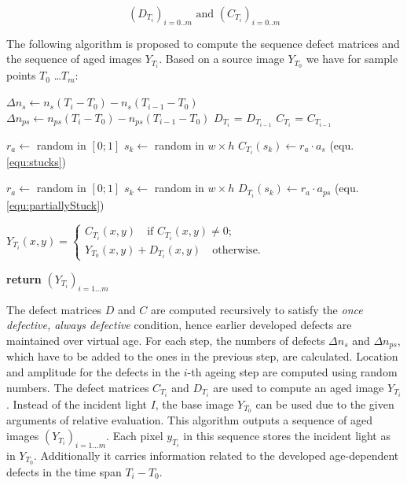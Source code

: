 \documentclass[10pt,twocolumn,letterpaper]{article}
\begin{document}
\begin{equation}
(D_{T_i})_{i=0..m} \text{ and } (C_{T_i})_{i=0..m}
\end{equation}

The following algorithm is proposed to compute the sequence defect matrices and the sequence of aged images $Y_{T_i}$. Based on a source image $Y_{T_0}$ we have for sample points $T_0$ \dots $T_m$:

\vspace{2mm}
\begin{algorithmic}[1]


\State $\Delta n_s\gets n_s(T_i - T_0) - n_s(T_{i-1} - T_0) $ 
\State $\Delta n_{ps}\gets n_{ps}(T_i - T_0) - n_{ps}(T_{i-1} - T_0) $
\State $D_{T_i}$ = $D_{T_{i-1}}$
\State $C_{T_i}$ = $C_{T_{i-1}}$

    \State $r_a \gets$ random in $[0;1]$
    \State $s_k \gets$ random in $w \times h$
    \State $C_{T_{i}}(s_k) \gets r_a \cdot a_s$ (equ. \ref{equ:stucks})
  \EndFor
  
    \State $r_a \gets$ random in $[0;1]$ 
    \State $s_k \gets$ random in $w \times h$
    \State $D_{T_i}({s_k}) \gets r_a \cdot a_{ps}$ (equ. \ref{equ:partiallyStuck})
  \EndFor
  
  
  $Y_{T_{i}}(x,y) = \begin{cases}
  C_{T_i}(x,y) \quad \text{if $C_{T_i}(x,y) \neq 0$}; \\
  Y_{T_{0}}(x,y) +D_{T_i}(x,y)  \quad \text{otherwise}.
  \end{cases}$
  
\EndFor
\State \textbf{return} $(Y_{T_i})_{i=1 \dots m}$
\EndProcedure
\end{algorithmic}

\vspace{5mm}


The defect matrices $D$ and $C$ are computed recursively to satisfy the \emph{once defective, always defective} condition, hence earlier developed defects are maintained over virtual age. For each step, the numbers of defects $\Delta n_s$ and $\Delta n_{ps}$, which have to be added to the ones in the previous step, are calculated. Location and amplitude for the defects in the $i$-th ageing step are computed using random numbers. The defect matrices $C_{T_i}$ and $D_{T_i}$ are used to compute an aged image $Y_{T_i}$. Instead of the incident light $I$, the base image $Y_{T_0}$ can be used due to the given arguments of relative evaluation. This algorithm outputs a sequence of aged images $(Y_{T_i})_{i=1 \dots m}$. Each pixel $y_{T_i}$ in this sequence stores the incident light as in $Y_{T_0}$. Additionally it carries information related to the developed age-dependent defects in the time span $T_i-T_0$.
 
\end{document}
